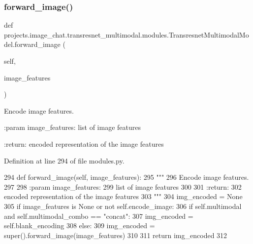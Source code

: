 \subsubsection{\texorpdfstring{forward\+\_\+image()}{forward\_image()}}
{\footnotesize\ttfamily def projects.\+image\+\_\+chat.\+transresnet\+\_\+multimodal.\+modules.\+Transresnet\+Multimodal\+Model.\+forward\+\_\+image (\begin{DoxyParamCaption}\item[{}]{self,  }\item[{}]{image\+\_\+features }\end{DoxyParamCaption})}

\begin{DoxyVerb}Encode image features.

:param image_features:
    list of image features

:return:
    encoded representation of the image features
\end{DoxyVerb}
 

Definition at line 294 of file modules.\+py.


\begin{DoxyCode}
294     \textcolor{keyword}{def }forward\_image(self, image\_features):
295         \textcolor{stringliteral}{"""}
296 \textcolor{stringliteral}{        Encode image features.}
297 \textcolor{stringliteral}{}
298 \textcolor{stringliteral}{        :param image\_features:}
299 \textcolor{stringliteral}{            list of image features}
300 \textcolor{stringliteral}{}
301 \textcolor{stringliteral}{        :return:}
302 \textcolor{stringliteral}{            encoded representation of the image features}
303 \textcolor{stringliteral}{        """}
304         img\_encoded = \textcolor{keywordtype}{None}
305         \textcolor{keywordflow}{if} image\_features \textcolor{keywordflow}{is} \textcolor{keywordtype}{None} \textcolor{keywordflow}{or} \textcolor{keywordflow}{not} self.encode\_image:
306             \textcolor{keywordflow}{if} self.multimodal \textcolor{keywordflow}{and} self.multimodal\_combo == \textcolor{stringliteral}{"concat"}:
307                 img\_encoded = self.blank\_encoding
308         \textcolor{keywordflow}{else}:
309             img\_encoded = super().forward\_image(image\_features)
310 
311         \textcolor{keywordflow}{return} img\_encoded
312 
\end{DoxyCode}
\mbox{\label{classprojects_1_1image__chat_1_1transresnet__multimodal_1_1modules_1_1TransresnetMultimodalModel_af645957261121c6c5a99ffc1f7e44f1e}} 
